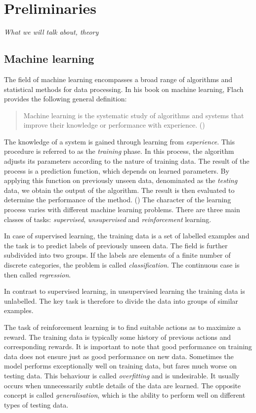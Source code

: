 \chapter{Preliminaries}

\textit{What we will talk about, theory}

\section{Machine learning}
The field of machine learning encompasses a broad range of algorithms and statistical methods for data processing. In his book on machine learning, Flach provides the following general definition:

\blockquote{Machine learning is the systematic study of algorithms and systems that improve their knowledge or performance with experience. (\cite{Flach:2012:MLA:2490546})} %
%
%
The knowledge of a system is gained through learning from \textit{experience}. This procedure is referred to as the \textit{training} phase. In this process, the algorithm adjusts its parameters according to the nature of training data. 
The result of the process is a prediction function, which depends on learned parameters. By applying this function on previously unseen data, denominated as the \textit{testing} data, we obtain the output of the algorithm. The result is then evaluated to determine the performance of the method. (\cite{Bishop:2006:PRM:1162264}) The character of the learning process varies with different machine learning problems. There are three main classes of tasks: \textit{supervised}, \textit{unsupervised} and \textit{reinforcement} learning.

In case of supervised learning, the training data is a set of labelled examples and the task is to predict labels of previously unseen data. The field is further subdivided into two groups. If the labels are elements of a finite number of discrete categories, the problem is called \textit{classification}. The continuous case is then called \textit{regression}.

In contrast to supervised learning, in unsupervised learning the training data is unlabelled. The key task is therefore to divide the data into  groups of similar examples.

The task of reinforcement learning is to find suitable actions as to maximize a reward. The training data is typically some history of previous actions and corresponding rewards.
%
%
It is important to note that good performance on training data does not ensure just as good performance on new data. Sometimes the model performs exceptionally well on training data, but fares much worse on testing data. This behaviour is called \textit{overfitting} and is undesirable. It usually occurs when unnecessarily subtle details of the data are learned. The opposite concept is called \textit{generalisation}, which is the ability to perform well on different types of testing data.

